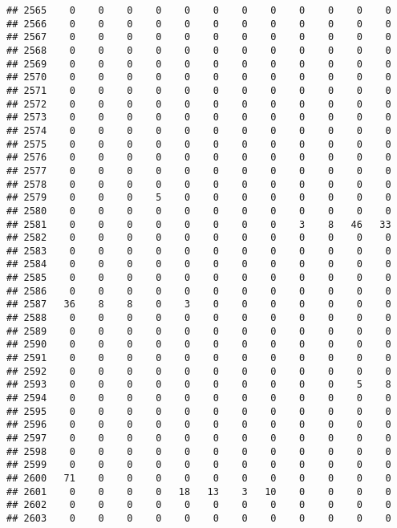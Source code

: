 \documentclass[]{article}
\begin{document}
\begin{verbatim}
## 2565    0    0    0    0    0    0    0    0    0    0    0    0
## 2566    0    0    0    0    0    0    0    0    0    0    0    0
## 2567    0    0    0    0    0    0    0    0    0    0    0    0
## 2568    0    0    0    0    0    0    0    0    0    0    0    0
## 2569    0    0    0    0    0    0    0    0    0    0    0    0
## 2570    0    0    0    0    0    0    0    0    0    0    0    0
## 2571    0    0    0    0    0    0    0    0    0    0    0    0
## 2572    0    0    0    0    0    0    0    0    0    0    0    0
## 2573    0    0    0    0    0    0    0    0    0    0    0    0
## 2574    0    0    0    0    0    0    0    0    0    0    0    0
## 2575    0    0    0    0    0    0    0    0    0    0    0    0
## 2576    0    0    0    0    0    0    0    0    0    0    0    0
## 2577    0    0    0    0    0    0    0    0    0    0    0    0
## 2578    0    0    0    0    0    0    0    0    0    0    0    0
## 2579    0    0    0    5    0    0    0    0    0    0    0    0
## 2580    0    0    0    0    0    0    0    0    0    0    0    0
## 2581    0    0    0    0    0    0    0    0    3    8   46   33
## 2582    0    0    0    0    0    0    0    0    0    0    0    0
## 2583    0    0    0    0    0    0    0    0    0    0    0    0
## 2584    0    0    0    0    0    0    0    0    0    0    0    0
## 2585    0    0    0    0    0    0    0    0    0    0    0    0
## 2586    0    0    0    0    0    0    0    0    0    0    0    0
## 2587   36    8    8    0    3    0    0    0    0    0    0    0
## 2588    0    0    0    0    0    0    0    0    0    0    0    0
## 2589    0    0    0    0    0    0    0    0    0    0    0    0
## 2590    0    0    0    0    0    0    0    0    0    0    0    0
## 2591    0    0    0    0    0    0    0    0    0    0    0    0
## 2592    0    0    0    0    0    0    0    0    0    0    0    0
## 2593    0    0    0    0    0    0    0    0    0    0    5    8
## 2594    0    0    0    0    0    0    0    0    0    0    0    0
## 2595    0    0    0    0    0    0    0    0    0    0    0    0
## 2596    0    0    0    0    0    0    0    0    0    0    0    0
## 2597    0    0    0    0    0    0    0    0    0    0    0    0
## 2598    0    0    0    0    0    0    0    0    0    0    0    0
## 2599    0    0    0    0    0    0    0    0    0    0    0    0
## 2600   71    0    0    0    0    0    0    0    0    0    0    0
## 2601    0    0    0    0   18   13    3   10    0    0    0    0
## 2602    0    0    0    0    0    0    0    0    0    0    0    0
## 2603    0    0    0    0    0    0    0    0    0    0    0    0

\end{verbatim}
\end{document}
